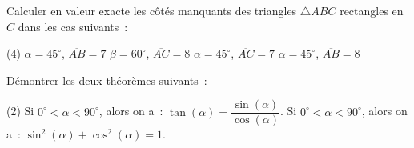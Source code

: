 \documentclass[a4paper,12pt]{article}
\begin{document}
\begin{activite}
	Calculer en valeur exacte les côtés manquants des triangles $\triangle ABC$ rectangles en $C$ dans les cas suivants~:
	\begin{tasks}(4)
		\task $\alpha=45^\circ$, $\overline{AB}=7$
		\task $\beta=60^\circ$, $\overline{AC}=8$
		\task $\alpha=45^\circ$, $\overline{AC}=7$
		\task $\alpha=45^\circ$, $\overline{AB}=8$
		
	\end{tasks}
\end{activite}
\begin{activite}
	Démontrer les deux théorèmes suivants~:
	\begin{tasks}(2)
		\task Si $0^\circ<\alpha<90^\circ$, alors on a~: $\tan(\alpha)=\dfrac{\sin(\alpha)}{\cos(\alpha)}$.
		\task Si $0^\circ<\alpha<90^\circ$, alors on a~: $\sin^2(\alpha)+\cos^2(\alpha)=1$.
	\end{tasks}
\end{activite}
\end{document}
